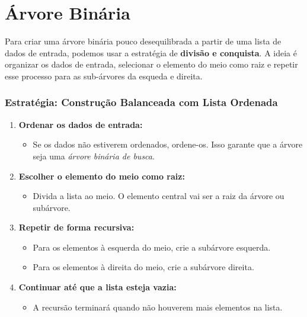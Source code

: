 \chapter{Árvore Binária}
\label{ch:arvore_binaria} %
Para criar uma árvore binária pouco desequilibrada a partir de uma lista de dados de entrada, podemos usar a estratégia de \textbf{divisão e conquista}. A ideia é organizar os dados de entrada, selecionar o elemento do meio como raiz e repetir esse processo para as sub-árvores da esqueda e direita.

\subsection*{Estratégia: Construção Balanceada com Lista Ordenada}

\begin{enumerate}
    \item \textbf{Ordenar os dados de entrada:}
    \begin{itemize}
        \item Se os dados não estiverem ordenados, ordene-os. Isso garante que a árvore seja uma \textit{árvore binária de busca}.
    \end{itemize}

    \item \textbf{Escolher o elemento do meio como raiz:}
    \begin{itemize}
        \item Divida a lista ao meio. O elemento central vai ser a raiz da árvore ou subárvore.
    \end{itemize}

    \item \textbf{Repetir de forma recursiva:}
    \begin{itemize}
        \item Para os elementos à esquerda do meio, crie a subárvore esquerda.
        \item Para os elementos à direita do meio, crie a subárvore direita.
    \end{itemize}

    \item \textbf{Continuar até que a lista esteja vazia:}
    \begin{itemize}
        \item A recursão terminará quando não houverem mais elementos na lista.
    \end{itemize}
\end{enumerate}

